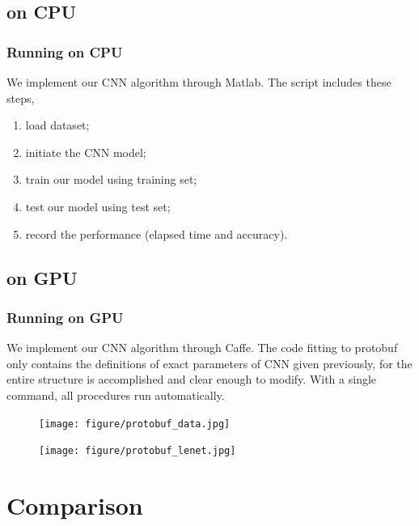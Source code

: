 \documentclass[10pt, mathserif]{beamer}	%
\newcommand{\ftitle}[1]{\frametitle{\hspace{4ex} {#1}}}	%
\begin{document}
\begin{CJK}{UTF8}{song}
\subsection{on CPU}
\begin{frame}
	\ftitle{Running on CPU}
	We implement our CNN algorithm through Matlab. The script includes these steps,
	\begin{enumerate}
		\item load dataset;
		\item initiate the CNN model;
		\item train our model using training set;
		\item test our model using test set;
		\item record the performance (elapsed time and accuracy).
	\end{enumerate}
\end{frame}

\subsection{on GPU}
\begin{frame}
	\ftitle{Running on GPU}
	\quad We implement our CNN algorithm through Caffe. The code fitting to protobuf only contains the definitions of exact parameters of CNN given previously, for the entire structure is accomplished and clear enough to modify. With a single command, all procedures run automatically.\\
	\begin{minipage}{0.45\textwidth}
	\begin{figure}
		\centering
		\texttt{[image: figure/protobuf\_data.jpg]}
	\end{figure}		
	\end{minipage}
	\begin{minipage}{0.45\textwidth}
	\begin{figure}
		\centering
		\texttt{[image: figure/protobuf\_lenet.jpg]}
	\end{figure}
	\end{minipage}
\end{frame}

\section{Comparison}

\end{CJK}
\end{document}
